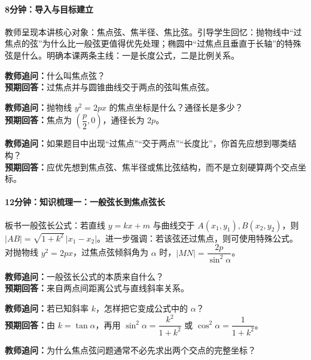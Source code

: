 \documentclass[UTF8,a4paper,11pt]{ctexart}
\begin{document}
\paragraph{8分钟：导入与目标建立}

教师呈现本讲核心对象：焦点弦、焦半径、焦比弦。引导学生回忆：抛物线中“过焦点的弦”为什么比一般弦更值得优先处理；椭圆中“过焦点且垂直于长轴”的特殊弦是什么。明确本课两条主线：一是长度公式，二是比例关系。

\noindent\textbf{教师追问：}什么叫焦点弦？\\

\textbf{预期回答：}过焦点并与圆锥曲线交于两点的弦叫焦点弦。\par

\noindent\textbf{教师追问：}抛物线 $y^2=2px$ 的焦点坐标是什么？通径长是多少？\\

\textbf{预期回答：}焦点为 $\left(\dfrac p2,0\right)$，通径长为 $2p$。\par

\noindent\textbf{教师追问：}如果题目中出现“过焦点”“交于两点”“长度比”，你首先应想到哪类结构？\\

\textbf{预期回答：}应优先想到焦点弦、焦半径或焦比弦结构，而不是立刻硬算两个交点坐标。\par

\paragraph{12分钟：知识梳理一：一般弦长到焦点弦长}

板书一般弦长公式：若直线 $y=kx+m$ 与曲线交于 $A(x_1,y_1),B(x_2,y_2)$，则 $|AB|=\sqrt{1+k^2}\,|x_1-x_2|$。进一步强调：若该弦还过焦点，则可使用特殊公式。对抛物线 $y^2=2px$，过焦点弦倾斜角为 $\alpha$ 时，$|MN|=\dfrac{2p}{\sin^2\alpha}$。

\noindent\textbf{教师追问：}一般弦长公式的本质来自什么？\\

\textbf{预期回答：}来自两点间距离公式与直线斜率关系。\par

\noindent\textbf{教师追问：}若已知斜率 $k$，怎样把它变成公式中的 $\alpha$？\\

\textbf{预期回答：}由 $k=\tan\alpha$，再用 $\sin^2\alpha=\dfrac{k^2}{1+k^2}$ 或 $\cos^2\alpha=\dfrac{1}{1+k^2}$。\par

\noindent\textbf{教师追问：}为什么焦点弦问题通常不必先求出两个交点的完整坐标？\\
\end{document}
